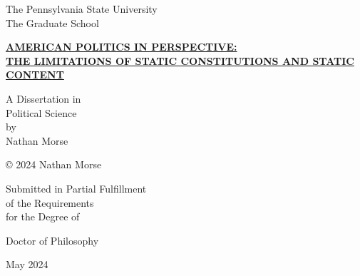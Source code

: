\begin{titlepage}
\centering

The Pennsylvania State University\\The Graduate School

\begin{doublespace} 
{\hypersetup{urlcolor=black} {\large\bfseries \href{https://nmorse.com/dissertation}{AMERICAN POLITICS IN PERSPECTIVE: \\THE LIMITATIONS OF STATIC CONSTITUTIONS AND STATIC CONTENT}}}

A Dissertation in\\Political Science\\by\\Nathan Morse
\end{doublespace}

© 2024 Nathan Morse

Submitted in Partial Fulfillment\\of the Requirements\\for the Degree of

Doctor of Philosophy

May 2024

\end{titlepage}


